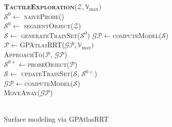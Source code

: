 \begin{algorithm}[t]
\textbf{\textsc{TactileExploration}}($\mathcal{Z}, \mathbb{V}_{\max})$\\ %
\LinesNumbered
\DontPrintSemicolon
\SetAlgoVlined {} 
  \label{ini_gp} 
  {
    $\mathcal{S}^0 \leftarrow $ \textsc{naiveProbe}() \\
  }
  \Else
  {
  \label{segment_object}  $\mathcal{S}^0 \leftarrow $ \textsc{segmentObject}($\mathcal{Z}$) \\
  }
  $\mathcal{S} \leftarrow$ \textsc{generateTrainSet}($\mathcal{S}^0$)
  $\mathcal{GP} \leftarrow $\textsc{computeModel}($\mathcal{S}$) \label{fini_ini_gp} \\
  {
    $\mathcal{P} \leftarrow $\textsc{GPAtlasRRT}($\mathcal{GP}, \mathbb{V}_{\max})$ \label{exploration} \\
    {
      \textsc{ApproachTo}($\mathcal{P}$, $\mathcal{GP}$) \label{approach} \\
      $\mathcal{S}^{0+} \leftarrow $\textsc{probeObject}($\mathcal{P}$) \label{probe} \\
      $\mathcal{S} \leftarrow$ \textsc{updateTrainSet($\mathcal{S}$, $\mathcal{S}^{0+}$)} \label{update_training} \\
      $\mathcal{GP} \leftarrow $\textsc{computeModel}($\mathcal{S}$) \label{re-compute} \\
      \textsc{MoveAway}($\mathcal{GP}$) \label{away} \\
    }
    \Else
    { 
       \label{solutionfound} \\
    }
  }
\caption{Surface modeling via GPAtlasRRT} \label{alg:solution}
\end{algorithm}


